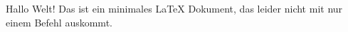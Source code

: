 \documentclass{minimal}
\begin{document}
Hallo Welt! Das ist ein minimales LaTeX Dokument, das leider nicht mit nur einem Befehl auskommt.
\end{document}
